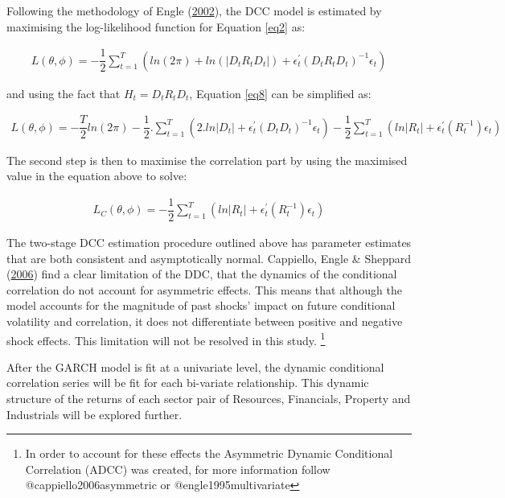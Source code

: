 \documentclass[11pt,preprint, authoryear]{elsarticle}
\numberwithin{equation}{section}
\numberwithin{figure}{section}
\numberwithin{table}{section}
\let\rmarkdownfootnote\footnote%
\def\footnote{\protect\rmarkdownfootnote}
\begin{document}
Following the methodology of Engle
(\protect\hyperlink{ref-engle2002}{2002}), the DCC model is estimated by
maximising the log-likelihood function for Equation \ref{eq2} as:

\begin{align}
  L(\theta, \phi) = -\dfrac{1}{2} \sum_{t=1}^T (ln(2\pi) + ln(\left|D_tR_tD_t\right|) + \epsilon_t^{'}(D_tR_tD_t)^{-1}\epsilon_t)  \label{eq8}
\end{align}

and using the fact that \(H_t = D_tR_tD_t\), Equation \ref{eq8} can be
simplified as:

\begin{align}
  L(\theta, \phi) = -\dfrac{T}{2} ln(2\pi) - \dfrac{1}{2} . \sum_{t=1}^T (2 . ln \left| D_t \right| + \epsilon_t^{'} (D_tD_t)^{-1} \epsilon_t) - \dfrac{1}{2}\sum_{t=1}^T (ln\left| R_t \right| + \epsilon_t^{'} (R_t^{-1}) \epsilon_t)  \label{eq9}
\end{align}

The second step is then to maximise the correlation part by using the
maximised value in the equation above to solve:

\begin{align}
  L_C(\theta, \phi) = -\dfrac{1}{2}\sum_{t=1}^T (ln\left| R_t \right| + \epsilon_t^{'} (R_t^{-1}) \epsilon_t) \label{eq10}
\end{align}

The two-stage DCC estimation procedure outlined above has parameter
estimates that are both consistent and asymptotically normal. Cappiello,
Engle \& Sheppard
(\protect\hyperlink{ref-cappiello2006asymmetric}{2006}) find a clear
limitation of the DDC, that the dynamics of the conditional correlation
do not account for asymmetric effects. This means that although the
model accounts for the magnitude of past shocks' impact on future
conditional volatility and correlation, it does not differentiate
between positive and negative shock effects. This limitation will not be
resolved in this study.
\footnote{In order to account for these effects the Asymmetric Dynamic Conditional Correlation (ADCC) was created, for more information follow @cappiello2006asymmetric or @engle1995multivariate}

After the GARCH model is fit at a univariate level, the dynamic
conditional correlation series will be fit for each bi-variate
relationship. This dynamic structure of the returns of each sector pair
of Resources, Financials, Property and Industrials will be explored
further.
\end{document}
